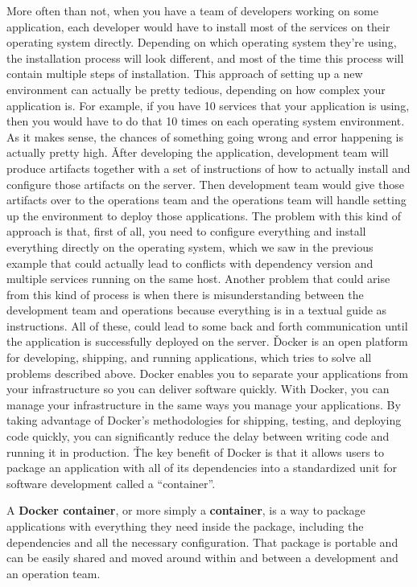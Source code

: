 More often than not, when you have a team of developers working on some application, each developer would have to
install most of the services on their operating system directly. Depending on which operating system they're using,
the installation process will look different, and most of the time this process will contain multiple steps of
installation. This approach of setting up a new environment can actually be pretty tedious, depending on how complex
your application is. For example, if you have 10 services that your application is using, then you would have to do
that 10 times on each operating system environment. As it makes sense, the chances of something going wrong and error
happening is actually pretty high. \v

After developing the application, development team will produce artifacts together with a set of instructions of how
to actually install and configure those artifacts on the server. Then development team would give those artifacts
over to the operations team and the operations team will handle setting up the environment to deploy those
applications. The problem with this kind of approach is that, first of all, you need to configure everything and
install everything directly on the operating system, which we saw in the previous example that could actually lead to
conflicts with dependency version and multiple services running on the same host. Another problem that could arise
from this kind of process is when there is misunderstanding between the development team and operations because
everything is in a textual guide as instructions. All of these, could lead to some back and forth communication until
the application is successfully deployed on the server. \v

Docker is an open platform for developing, shipping, and running applications, which tries to solve all problems
described above. Docker enables you to separate your applications from your infrastructure so you can deliver
software quickly. With Docker, you can manage your infrastructure in the same ways you manage your applications. By
taking advantage of Docker’s methodologies for shipping, testing, and deploying code quickly, you can significantly
reduce the delay between writing code and running it in production. \v

The key benefit of Docker is that it allows users to package an application with all of its dependencies into a
standardized unit for software development called a ``container''.

A \textbf{Docker container}, or more simply a \textbf{container}, is a way to package applications with everything
they need inside the package, including the dependencies and all the necessary configuration. That package is
portable and can be easily shared and moved around within and between a development and an operation team.
\ed

